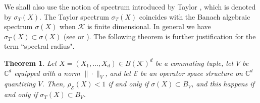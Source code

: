 \documentclass[12pt]{amsart}
\numberwithin{equation}{section}
\newtheorem{theorem}{Theorem}[section]
\theoremstyle{definition}
\newcommand{\cE}{\mathcal{E}}
\newcommand{\cK}{\mathcal{K}}
\newcommand{\bC}{\mathbb{C}}
\newcommand{\C}{\mathbb{C}}
\begin{document}
We shall also use the notion of spectrum introduced by Taylor \cite{Taylor-joint_spectrum}, which is denoted by $\sigma_T(X)$. 
The Taylor spectrum $\sigma_T(X)$ coincides with the Banach algebraic spectrum $\sigma(X)$ when $\cK$ is finite dimensional. 
In general we have $\sigma_T(X) \subset \sigma(X)$ (see \cite[Proposition 25.3]{muller2007spectral} or \cite{Curto-applications,Taylor-joint_spectrum}). 
The following theorem is further justification for the term ``spectral radius". 

\begin{theorem} \label{thm:comm_specrad}
    Let $X = (X_1,\ldots,X_d) \in B(\cK)^d$ be a commuting tuple, let $V$ be $\bC^d$ equipped with a norm $\|\cdot\|_V$, and let $\cE$ be an operator space structure on $\C^d$ quantizing $V$. Then, $\rho_{\cE}(X) < 1$ if and only if $\sigma(X) \subset B_V$, and this happens if and only if $\sigma_T(X) \subset B_V$. 
\end{theorem}
\end{document}
